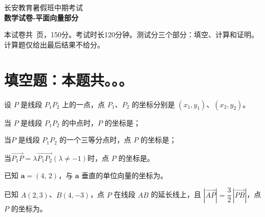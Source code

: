 \documentclass[12pt, a4paper]{article}
\def\mycenter#1{\begin{center} \bf \sffamily \large #1 \end{center}}
\begin{document}
\begin{center}
    \huge 长安教育暑假班中期考试 \\
    \Large \bf \sffamily 数学试卷-平面向量部分
\end{center}

本试卷共\pageref{LastPage}\ 页，150分。考试时长120分钟。测试分三个部分：填空、计算和证明。计算题仅给出最后结果不给分。


\section{填空题：本题共。。。}
\begin{question}[resume]
\item 设 $P$ 是线段 $P_{1}P_{2}$ 上的一点，点 $P_{1}$、$P_{2}$ 的坐标分别是 $(x_{1},y_{1})$、$(x_{2},y_{2})$。
\begin{question}
    \item 当 $P$ 是线段 $P_{1}P_{2}$ 的中点时，$P$ 的坐标是\underline{\hspace{6em}}；
    \item 当$P$ 是线段 $P_{1}P_{2}$ 的一个三等分点时，点 $P$ 的坐标是\underline{\hspace{6em}}；
    \item 当$\overrightarrow{P_1P}=\lambda \overrightarrow{P_1P_2}(\lambda\neq -1)$时，点 $P$ 的坐标是\underline{\hspace{8em}}。
\end{question}
\item 已知 $\bm{a} = (4,\,2)$，与 $\bm{a}$ 垂直的单位向量的坐标为\underline{\hspace{6em}}。
\item 已知 $A(2,3)$、$B(4,-3)$，点 $P$ 在线段 $AB$ 的延长线上，且
$| \overrightarrow{AP}|=\dfrac{3}{2}\,| \overrightarrow{PB}|$，点 $P$ 的坐标为\underline{\hspace{6em}}。


\end{question}
\end{document}
